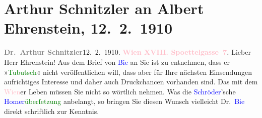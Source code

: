 

               \section[Arthur Schnitzler an Albert Ehrenstein, 12. 2. 1910]{ Arthur Schnitzler an Albert Ehrenstein, 12. 2. 1910}\nopagebreak{}\rehead{ }\normalsize\beginnumbering{} \toendnotes[C]{\smallbreak\pagebreak[2]} 
\toendnotes[C]{\smallbreak}\pstart
           \noindent{}{\pb}\textcolor{gray}{\textbf{Dr. Arthur Schnitzler}}\hfill 12. 2. 1910.\pend
           \pstart
           \textcolor{gray}{\textbf{\textcolor{pink}{Wien XVIII. Spoettelgasse 7}{}\ledrightnote{\textcolor{pink}{Edmund-Weiß-Gasse}}.}}\pend
           \pstart{}Lieber Herr Ehrenstein!\pend\pstart
           Aus dem Brief von \textcolor{blue}{Bie}{}\ledrightnote{\textcolor{blue}{Oskar Bie}} an Sie ist zu entnehmen,
                    dass er »\textcolor{green}{Tubutsch}{}\ledrightnote{\textcolor{green}{Tubutsch}}« nicht veröffentlichen will,
                    dass aber für Ihre nächsten Einsendungen aufrichtiges Interesse und daher auch
                    Druckchancen vorhanden sind. Das mit dem \textcolor{pink}{Wien}{}\ledrightnote{\textcolor{pink}{Wien}}er
                    Leben müssen Sie nicht so wörtlich nehmen. Was die \textcolor{blue}{Schröder}{}\ledrightnote{\textcolor{blue}{Rudolf Alexander Schröder}}’sche \textcolor{green}{\textcolor{blue}{Homer}{}\ledrightnote{\textcolor{blue}{Homer}}überſetzung}{} anbelangt, so
                    bringen Sie diesen Wunsch vielleicht Dr. \textcolor{blue}{Bie}{}\ledrightnote{\textcolor{blue}{Oskar Bie}}
                    direkt schriftlich zur Kenntnis.\pend
           \pstart
